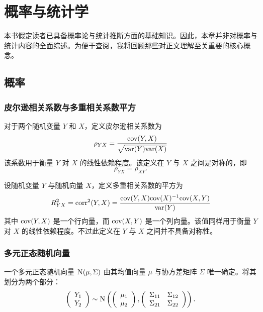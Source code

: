
\chapter{概率与统计学}
 \label{chapter::basic-prob-append}
 
 
本书假定读者已具备概率论与统计推断方面的基础知识。因此，本章并非对概率与统计内容的全面综述。为便于查阅，我将回顾那些对正文理解至关重要的核心概念。  
 
 

\section{概率}



\subsection{皮尔逊相关系数与多重相关系数平方}
\label{sec::measure-pearson-r2}

对于两个随机变量 $Y$ 和 $X$，定义皮尔逊相关系数为
$$
\rho_{YX} = \frac{  \textup{cov}(Y, X)  }{  \sqrt{  \textup{var}(Y)   \textup{var}(X) }   }
$$
该系数用于衡量 $Y$ 对 $X$ 的线性依赖程度。该定义在 $Y$ 与 $X$ 之间是对称的，即
$$
\rho_{YX}  = \rho_{XY} .
$$


设随机变量 $Y$ 与随机向量 $X$，定义多重相关系数的平方为
$$
R^2_{YX} = \textup{corr}^2(Y, X )
= \frac{   \textup{cov}(Y, X) \textup{cov}(X)^{-1} \textup{cov}(X, Y)  }{  \textup{var}(Y) }
$$
其中 $\textup{cov}(Y, X) $ 是一个行向量，而 $\textup{cov}(X, Y)$ 是一个列向量。该值同样用于衡量 $Y$ 对 $X$ 的线性依赖程度。不过此定义在 $Y$ 与 $X$ 之间并不具备对称性。



\subsection{多元正态随机向量}
\label{sec::multivariate-normal}
 
一个多元正态随机向量 $\textsc{N}(\mu, \Sigma)$ 由其均值向量 $\mu$ 与协方差矩阵 $\Sigma$ 唯一确定。将其划分为两个部分：
\[
\left(\begin{array}{c}
Y_{1}\\
Y_{2}
\end{array}\right)\sim\textsc{N}\left(\left(\begin{array}{c}
\mu_{1}\\
\mu_{2}
\end{array}\right),\left(\begin{array}{cc}
\Sigma_{11} & \Sigma_{12}\\
\Sigma_{21} & \Sigma_{22}
\end{array}\right)\right).
\]


